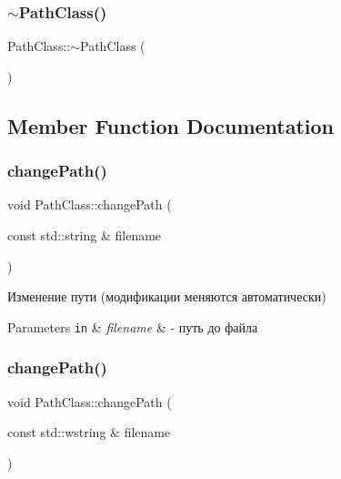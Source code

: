\subsubsection{\texorpdfstring{$\sim$\+Path\+Class()}{~PathClass()}}
{\footnotesize\ttfamily Path\+Class\+::$\sim$\+Path\+Class (\begin{DoxyParamCaption}{ }\end{DoxyParamCaption})}



\subsection{Member Function Documentation}
\mbox{\label{class_path_class_a86c71455f3a42e46f3f29d8c289d3e6d}} 
\subsubsection{\texorpdfstring{change\+Path()}{changePath()}\hspace{0.1cm}{\footnotesize\ttfamily [1/2]}}
{\footnotesize\ttfamily void Path\+Class\+::change\+Path (\begin{DoxyParamCaption}\item[{const std\+::string \&}]{filename }\end{DoxyParamCaption})}



Изменение пути (модификации меняются автоматически) 


\begin{DoxyParams}[1]{Parameters}
\mbox{\tt in}  & {\em filename} & -\/ путь до файла \\
\hline
\end{DoxyParams}
\mbox{\label{class_path_class_a8eaba9bf62b07b9ad641c28ff17a9817}} 
\subsubsection{\texorpdfstring{change\+Path()}{changePath()}\hspace{0.1cm}{\footnotesize\ttfamily [2/2]}}
{\footnotesize\ttfamily void Path\+Class\+::change\+Path (\begin{DoxyParamCaption}\item[{const std\+::wstring \&}]{filename }\end{DoxyParamCaption})}



